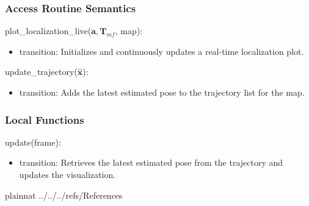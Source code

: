 \documentclass[12pt, titlepage]{article}
\begin{document}
\subsubsection{Access Routine Semantics}

\noindent plot\_localization\_live($\mathbf{a}, \mathbf{T}_{mf}$, map):
\begin{itemize}
\item transition: Initializes and continuously updates a real-time localization plot.
\end{itemize}

\noindent update\_trajectory($\hat{\mathbf{x}}$):
\begin{itemize}
\item transition: Adds the latest estimated pose to the trajectory list for the map.
\end{itemize}


\subsubsection{Local Functions}
\noindent update(frame):
\begin{itemize}
    \item transition: Retrieves the latest estimated pose from the trajectory and updates the visualization.
\end{itemize}

\newpage


 {plainnat}
 {../../../refs/References}






\end{document}
